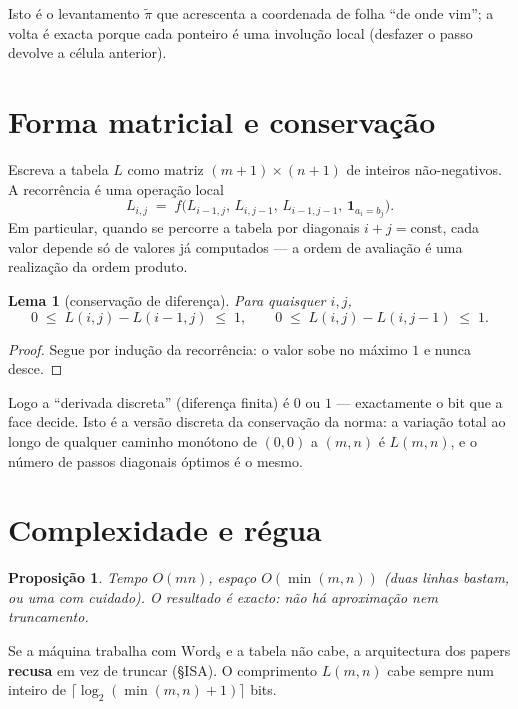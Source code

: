 \documentclass[11pt,a4paper]{article}
\newtheorem{lema}[teorema]{Lema}
\newtheorem{proposicao}[teorema]{Proposição}
\begin{document}
\noindent Isto é o levantamento $\tilde\pi$ que acrescenta a
coordenada de folha ``de onde vim''; a volta é exacta porque cada
ponteiro é uma involução local (desfazer o passo devolve a célula
anterior).

\section{Forma matricial e conservação}

Escreva a tabela $L$ como matriz $(m+1)\times(n+1)$ de inteiros
não-negativos. A recorrência é uma operação local
\[
L_{i,j}\;=\;f\bigl(L_{i-1,j},\,L_{i,j-1},\,L_{i-1,j-1},\,\mathbf{1}_{a_i=b_j}\bigr).
\]
Em particular, quando se percorre a tabela por diagonais
$i+j=\mathrm{const}$, cada valor depende só de valores já
computados --- a ordem de avaliação é uma realização da ordem
produto.

\begin{lema}[conservação de diferença]
Para quaisquer $i,j$,
\[
0\;\le\;L(i,j)-L(i-1,j)\;\le\;1,\qquad
0\;\le\;L(i,j)-L(i,j-1)\;\le\;1.
\]
\end{lema}

\begin{proof}
Segue por indução da recorrência: o valor sobe no máximo $1$ e nunca
desce.
\end{proof}

\noindent Logo a ``derivada discreta'' (diferença finita) é $0$ ou
$1$ --- exactamente o bit que a face decide. Isto é a versão
discreta da conservação da norma: a variação total ao longo de
qualquer caminho monótono de $(0,0)$ a $(m,n)$ é $L(m,n)$, e o
número de passos diagonais óptimos é o mesmo.

\section{Complexidade e régua}

\begin{proposicao}
Tempo $O(mn)$, espaço $O(\min(m,n))$ (duas linhas bastam, ou uma
com cuidado). O resultado é exacto: não há aproximação nem
truncamento.
\end{proposicao}

\noindent Se a máquina trabalha com $\mathrm{Word}_8$ e a tabela não
cabe, a arquitectura dos papers \textbf{recusa} em vez de truncar
(§ISA). O comprimento $L(m,n)$ cabe sempre num inteiro de
$\lceil\log_2(\min(m,n)+1)\rceil$ bits.
\end{document}
